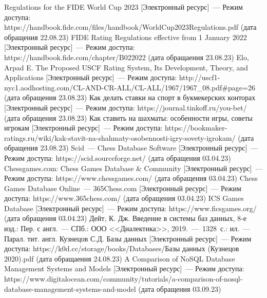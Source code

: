 \begin{thebibliography}{}
	 Regulations for the FIDE World Cup 2023 [Электронный ресурс]~--- Режим доступа: https://handbook.fide.com/files/handbook/WorldCup2023Regulations.pdf (дата обращения 22.08.23)
	 FIDE Rating Regulations effective from 1 January 2022 [Электронный ресурс]~--- Режим доступа: https://handbook.fide.com/chapter/B022022 (дата обращаения 23.08.23)
	 Elo, Arpad E. The Proposed USCF Rating System, Its Development, Theory, and Applications [Электронный ресурс]~--- Режим доступа: http://uscf1-nyc1.aodhosting.com/CL-AND-CR-ALL/CL-ALL/1967/1967\_08.pdf\#page=26 (дата обращения 23.08.23)
	 Как делать ставки на спорт в букмекерских конторах [Электронный ресурс]~--- Режим доступа: https://journal.tinkoff.ru/you-bet/ (дата обращения 23.08.23)
	 Как ставить на шахматы: особенности игры, советы игрокам [Электронный ресурс]~--- Режим доступа: https://bookmaker-ratings.ru/wiki/kak-stavit-na-shahmaty-osobennosti-igry-sovety-igrokam/ (дата обращения 23.08.23)
	 Scid~--- Chess Database Software [Электронный ресурс]~--- Режим доступа: https://scid.sourceforge.net/ (дата обращения 03.04.23)
	 Chessgames.com: Chess Games Database \& Community [Электронный ресурс]~--- Режим доступа: https://www.chessgames.com/ (дата обращения 03.04.23)
	 Chess Games Database Online~--- 365Chess.com [Электронный ресурс]~--- Режим доступа: https://www.365chess.com/ (дата обращения 03.04.23)
	 ICS Games Database [Электронный ресурс]~--- Режим доступа: https://www.ficsgames.org/ (дата обращения 03.04.23)
	 Дейт, К. Дж. Введение в системы баз данных, 8-е изд.: Пер. с англ.~--- СПб.: ООО <<Диалектика>>, 2019.~---~1328~с.: ил.~--- Парал. тит. англ.
	 Кузнецов С.Д. Базы данных [Электронный ресурс]~--- Режим доступа: https://k0d.cc/storage/books/Databases/Базы данных (Кузнецов 2020).pdf (дата обращаения 24.08.23)
	 A Comparison of NoSQL Database Management Systems and Models [Электронный ресурс]~--- Режим доступа: https://www.digitalocean.com/community/tutorials/a-comparison-of-nosql-database-management-systems-and-model (дата обращения 03.09.23)
\end{thebibliography}
